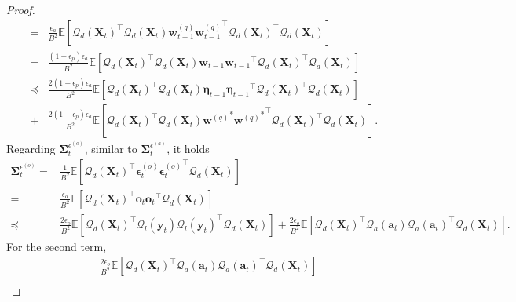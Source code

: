 \documentclass[11pt, letterpaper]{article}
\begin{document}
\begin{proof}
\begin{equation}
\begin{aligned}
            =&\frac{\epsilon_a}{B^2}\mathbb{E}\left[{\mathcal{Q}_d(\mathbf{X}_t)}^\top \mathcal{Q}_d(\mathbf{X}_t)\mathbf{w}_{t-1}^{(q)}{\mathbf{w}_{t-1}^{(q)}}^\top{\mathcal{Q}_d(\mathbf{X}_t)}^\top  \mathcal{Q}_d(\mathbf{X}_t)\right]\\
            =&\frac{(1+\epsilon_p)\epsilon_a}{B^2}\mathbb{E}\left[{\mathcal{Q}_d(\mathbf{X}_t)}^\top \mathcal{Q}_d(\mathbf{X}_t)\mathbf{w}_{t-1}{\mathbf{w}_{t-1}}^\top{\mathcal{Q}_d(\mathbf{X}_t)}^\top  \mathcal{Q}_d(\mathbf{X}_t)\right]\\
            \preceq &\frac{2(1+\epsilon_p)\epsilon_a}{B^2}\mathbb{E}\left[{\mathcal{Q}_d(\mathbf{X}_t)}^\top \mathcal{Q}_d(\mathbf{X}_t)\boldsymbol{\eta}_{t-1}{\boldsymbol{\eta}_{t-1}}^\top{\mathcal{Q}_d(\mathbf{X}_t)}^\top  \mathcal{Q}_d(\mathbf{X}_t)\right]\\
            +&\frac{2(1+\epsilon_p)\epsilon_a}{B^2}\mathbb{E}\left[{\mathcal{Q}_d(\mathbf{X}_t)}^\top \mathcal{Q}_d(\mathbf{X}_t){\mathbf{w}^{(q)}}^*{{\mathbf{w}^{(q)}}^*}^\top{\mathcal{Q}_d(\mathbf{X}_t)}^\top  \mathcal{Q}_d(\mathbf{X}_t)\right].
        \end{aligned}
    \end{equation}
    Regarding $\boldsymbol{\Sigma}_t^{\epsilon^{(o)}}$,
    similar to $\boldsymbol{\Sigma}_t^{\epsilon^{(a)}}$, it holds
    \begin{equation*}
        \begin{aligned}
            \boldsymbol{\Sigma}_t^{\epsilon^{(o)}}=&\frac{1}{B^2}\mathbb{E}\left[{\mathcal{Q}_d(\mathbf{X}_t)}^\top \boldsymbol{\epsilon}_t^{(o)}{\boldsymbol{\epsilon}_t^{(o)}}^\top \mathcal{Q}_d(\mathbf{X}_t)\right]\\
            =&\frac{\epsilon_o}{B^2}\mathbb{E}\left[{\mathcal{Q}_d(\mathbf{X}_t)}^\top \mathbf{o}_t{\mathbf{o}_t}^\top \mathcal{Q}_d(\mathbf{X}_t)\right]\\
            \preceq&\frac{2\epsilon_o}{B^2}\mathbb{E}\left[{\mathcal{Q}_d(\mathbf{X}_t)}^\top \mathcal{Q}_l(\mathbf{y}_t)\mathcal{Q}_l(\mathbf{y}_t)^\top \mathcal{Q}_d(\mathbf{X}_t)\right]
            +\frac{2\epsilon_o}{B^2}\mathbb{E}\left[{\mathcal{Q}_d(\mathbf{X}_t)}^\top \mathcal{Q}_a(\mathbf{a}_t)\mathcal{Q}_a(\mathbf{a}_t)^\top \mathcal{Q}_d(\mathbf{X}_t)\right].
        \end{aligned}
    \end{equation*}
    For the second term,
    \begin{equation*}
        \begin{aligned}
            &\frac{2\epsilon_o}{B^2}\mathbb{E}\left[{\mathcal{Q}_d(\mathbf{X}_t)}^\top \mathcal{Q}_a(\mathbf{a}_t)\mathcal{Q}_a(\mathbf{a}_t)^\top \mathcal{Q}_d(\mathbf{X}_t)\right]\\

\end{aligned}
\end{equation*}
\end{proof}
\end{document}
